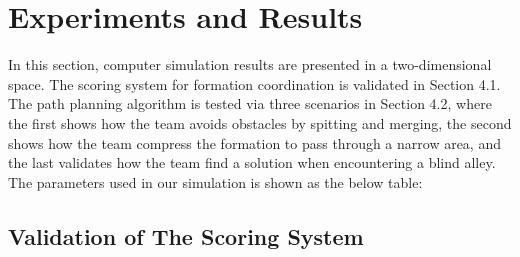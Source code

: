 \chapter{Experiments and Results}
In this section, computer simulation results are presented in a two-dimensional space. The scoring system for formation coordination is validated in Section 4.1. The path planning algorithm is tested via three scenarios in Section 4.2, where the first shows how the team avoids obstacles by spitting and merging, the second shows how the team compress the formation to pass through a narrow area, and the last validates how the team find a solution when encountering a blind alley. The parameters used in our simulation is shown as the below table:


\begin{center}
\label{table:combination}
\end{center}


\section{Validation of The Scoring System}

